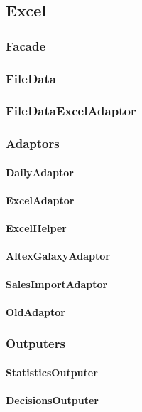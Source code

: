 \subsection{Excel}
	\subsubsection{Facade}
	\subsubsection{FileData}
	\subsubsection{FileDataExcelAdaptor}
	\subsubsection{Adaptors}
		\paragraph{DailyAdaptor}
		\paragraph{ExcelAdaptor}
		\paragraph{ExcelHelper}
		\paragraph{AltexGalaxyAdaptor}
		\paragraph{SalesImportAdaptor}
		\paragraph{OldAdaptor}
	\subsubsection{Outputers}
		\paragraph{StatisticsOutputer}
		\paragraph{DecisionsOutputer}
